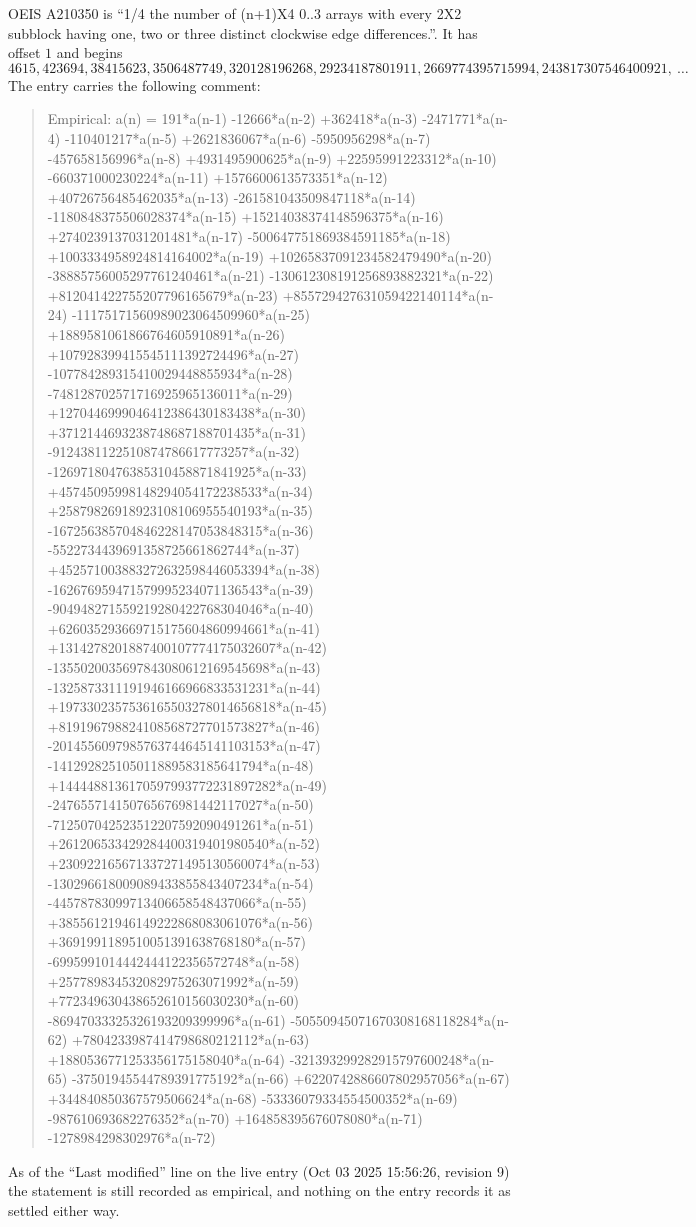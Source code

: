 \documentclass[11pt,a4paper]{article}
\theoremstyle{plain}
\theoremstyle{definition}
\begin{document}
OEIS A210350 is ``1/4 the number of (n+1)X4 0..3 arrays with every 2X2 subblock having one, two or three distinct clockwise edge differences.''. It has offset $1$ and begins
\[
4615, 423694, 38415623, 3506487749, 320128196268, 29234187801911, 2669774395715994, 243817307546400921,\ \dots
\]
The entry carries the following comment:
\begin{quote}\small
Empirical: a(n) = 191*a(n-1) -12666*a(n-2) +362418*a(n-3) -2471771*a(n-4) -110401217*a(n-5) +2621836067*a(n-6) -5950956298*a(n-7) -457658156996*a(n-8) +4931495900625*a(n-9) +22595991223312*a(n-10) -660371000230224*a(n-11) +1576600613573351*a(n-12) +40726756485462035*a(n-13) -261581043509847118*a(n-14) -1180848375506028374*a(n-15) +15214038374148596375*a(n-16) +2740239137031201481*a(n-17) -500647751869384591185*a(n-18) +1003334958924814164002*a(n-19) +10265837091234582479490*a(n-20) -38885756005297761240461*a(n-21) -130612308191256893882321*a(n-22) +812041422755207796165679*a(n-23) +855729427631059422140114*a(n-24) -11175171560989023064509960*a(n-25) +1889581061866764605910891*a(n-26) +107928399415545111392724496*a(n-27) -107784289315410029448855934*a(n-28) -748128702571716925965136011*a(n-29) +1270446999046412386430183438*a(n-30) +3712144693238748687188701435*a(n-31) -9124381122510874786617773257*a(n-32) -12697180476385310458871841925*a(n-33) +45745095998148294054172238533*a(n-34) +25879826918923108106955540193*a(n-35) -167256385704846228147053848315*a(n-36) -5522734439691358725661862744*a(n-37) +452571003883272632598446053394*a(n-38) -162676959471579995234071136543*a(n-39) -904948271559219280422768304046*a(n-40) +626035293669715175604860994661*a(n-41) +1314278201887400107774175032607*a(n-42) -1355020035697843080612169545698*a(n-43) -1325873311191946166966833531231*a(n-44) +1973302357536165503278014656818*a(n-45) +819196798824108568727701573827*a(n-46) -2014556097985763744645141103153*a(n-47) -141292825105011889583185641794*a(n-48) +1444488136170597993772231897282*a(n-49) -247655714150765676981442117027*a(n-50) -712507042523512207592090491261*a(n-51) +261206533429284400319401980540*a(n-52) +230922165671337271495130560074*a(n-53) -130296618009089433855843407234*a(n-54) -44578783099713406658548437066*a(n-55) +38556121946149222868083061076*a(n-56) +3691991189510051391638768180*a(n-57) -6995991014442444122356572748*a(n-58) +257789834532082975263071992*a(n-59) +772349630438652610156030230*a(n-60) -86947033325326193209399996*a(n-61) -50550945071670308168118284*a(n-62) +7804233987414798680212112*a(n-63) +1880536771253356175158040*a(n-64) -321393299282915797600248*a(n-65) -37501945544789391775192*a(n-66) +6220742886607802957056*a(n-67) +344840850367579506624*a(n-68) -53336079334554500352*a(n-69) -987610693682276352*a(n-70) +164858395676078080*a(n-71) -1278984298302976*a(n-72)
\end{quote}
As of the ``Last modified'' line on the live entry (Oct 03 2025 15:56:26, revision 9) the statement is
still recorded as empirical, and nothing on the entry records it as settled either way.
\end{document}
